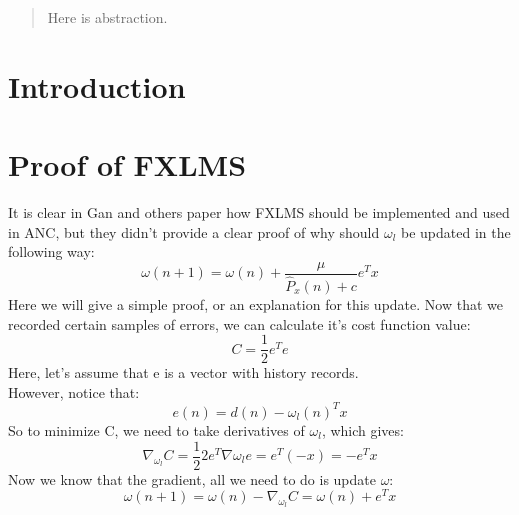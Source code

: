 \documentclass[conference,compsoc]{IEEEtran}
\begin{document}




\maketitle

\begin{abstract}
Here is abstraction.
\end{abstract}





%
\IEEEpeerreviewmaketitle



\section{Introduction}

\section{Proof of FXLMS}

	It is clear in Gan and others paper\cite{Gan2005Adaptive,Song2005Robust} how FXLMS should be implemented and used in ANC, but they didn't provide a clear proof of why should $\omega_l$ be updated in the following way:
	$$\omega(n+1) = \omega(n) + \frac{\mu}{\widehat P_x(n)+c}e^Tx$$
	Here we will give a simple proof, or an explanation for this update.
	Now that we recorded certain samples of errors, we can calculate it's cost function value:
	$$ C =\frac{1}{2} e^Te $$
	Here, let's assume that e is a vector with history records. \\
	However, notice that:
	$$ e(n) = d(n) - \omega_l(n)^T x$$
	So to minimize C, we need to take derivatives of $\omega_l$, which gives:
	$$ \nabla_{\omega_l} C = \frac{1}{2}2e^T\nabla{\omega_l} e = e^T(-x) = -e^Tx $$
	Now we know that the gradient, all we need to do is update $\omega$:
	$$ \omega(n+1) = \omega(n) - \nabla_{\omega_l} C = \omega(n) + e^Tx $$
	
\end{document}
